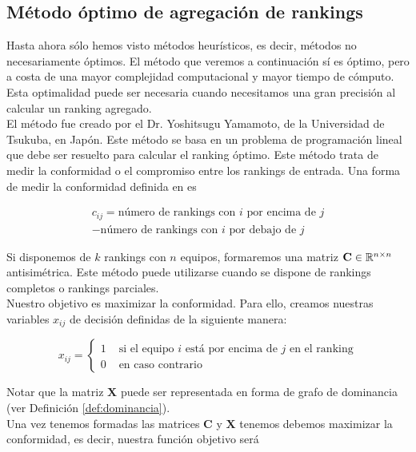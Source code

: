 \subsection{Método óptimo de agregación de rankings}

Hasta ahora sólo hemos visto métodos heurísticos, es decir, métodos no necesariamente óptimos. El método que veremos a continuación sí es óptimo, pero a costa de una mayor complejidad computacional y mayor tiempo de cómputo. Esta optimalidad puede ser necesaria cuando necesitamos una gran precisión al calcular un ranking agregado.\\

El método fue creado por el Dr. Yoshitsugu Yamamoto, de la Universidad de Tsukuba, en Japón. Este método se basa en un problema de programación lineal que debe ser resuelto para calcular el ranking óptimo. Este método trata de medir la conformidad o el compromiso entre los rankings de entrada. Una forma de medir la conformidad definida en \cite{langville2012s} es

\begin{multline} \label{eq:conformidad}
c_{ij} = \text{número de rankings con $i$ por encima de $j$} \\ - \text{número de rankings con $i$ por debajo de $j$}
\end{multline}

Si disponemos de $k$ rankings con $n$ equipos, formaremos una matriz $\mathbf{C} \in \mathbb{R}^{n\times n}$ antisimétrica. Este método puede utilizarse cuando se dispone de rankings completos o rankings parciales.\\

Nuestro objetivo es maximizar la conformidad. Para ello, creamos nuestras variables $x_{ij}$ de decisión definidas de la siguiente manera:

\begin{equation}
x_{ij} = \begin{cases}
1 & \text{ si el equipo $i$ está por encima de $j$ en el ranking}\\
0 & \text{ en caso contrario}
\end{cases}
\end{equation}

Notar que la matriz $\mathbf{X}$ puede ser representada en forma de grafo de dominancia (ver Definición \ref{def:dominancia}).\\

Una vez tenemos formadas las matrices $\mathbf{C}$ y $\mathbf{X}$ tenemos debemos maximizar la conformidad, es decir, nuestra función objetivo será

